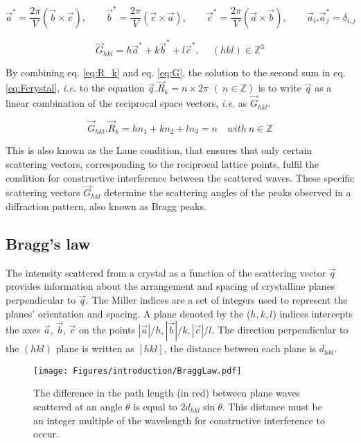 \begin{equation}
    \vec{a}^*=\frac{2\pi}{V}(\vec{b}\times \vec{c}), \qquad
    \vec{b}^*=\frac{2\pi}{V}(\vec{c}\times \vec{a}), \qquad
    \vec{c}^*=\frac{2\pi}{V}(\vec{a}\times \vec{b}), \qquad
    \vec{a}_i . \vec{a}_j^* = \delta_{i,j}
\end{equation}

\begin{equation}
    \label{eq:G}
    \vec{G}_{hkl}=h\vec{a}^* + k\vec{b}^* + l\vec{c}^*, \quad \ (hkl) \in \mathbb{Z}^3
\end{equation}

By combining eq. \ref{eq:R_k} and eq. \ref{eq:G}, the solution to the second sum in eq. \ref{eq:Fcrystal}, \textit{i.e.} to the equation $\vec{q}.\vec{R}_k = n \times 2\pi$ $(\ n \in \mathbb{Z})$ is to write $\vec{q}$ as a linear combination of the reciprocal space vectors, \textit{i.e.} as $\vec{G}_{hkl}$.

\begin{equation}
    \label{eq:LaueCond}
    \vec{G}_{hkl} . \vec{R}_k = hn_1 + kn_2 + ln_3 = n \quad  with \ n \in \mathbb{Z}
\end{equation}

This is also known as the Laue condition, that ensures that only certain scattering vectors, corresponding to the reciprocal lattice points, fulfil the condition for constructive interference between the scattered waves.
These specific scattering vectors $\vec{G}_{hkl}$ determine the scattering angles of the peaks observed in a diffraction pattern, also known as Bragg peaks.

\subsection{Bragg's law}\label{sec:BraggLaw}

The intensity scattered from a crystal as a function of the scattering vector $\vec{q}$ provides information about the arrangement and spacing of crystalline planes perpendicular to $\vec{q}$.
The Miller indices are a set of integers used to represent the planes' orientation and spacing.
A plane denoted by the ($h, k, l$) indices intercepts the axes $\vec{a}$, $\vec{b}$, $\vec{c}$ on the points $|\vec{a}|/h, |\vec{b}|/k, |\vec{c}|/l$.
The direction perpendicular to the $(hkl)$ plane is written as $[hkl]$, the distance between each plane is $d_{hkl}$.

\begin{figure}[!htb]
    \centering
    \texttt{[image: Figures/introduction/BraggLaw.pdf]}
    \caption{
    The difference in the path length (in red) between plane waves scattered at an angle $\theta$ is equal to $2d_{hkl} \sin{\theta}$.
    This distance must be an integer multiple of the wavelength for constructive interference to occur.
    }
    \label{fig:BraggLaw}
\end{figure}

